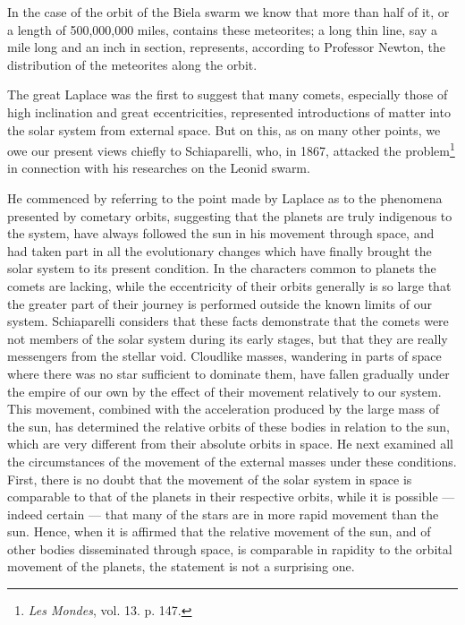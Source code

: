 \documentclass[a4paper, 12pt, oneside, polutonikogreek, english]{article}
\begin{document}
In the case of the orbit of the Biela swarm we know that more than half of it, or a length of 500,000,000 miles, contains these meteorites; a long thin line, say a mile long and an inch in section, represents, according to Professor Newton, the distribution of the meteorites along the orbit.

The great Laplace was the first to suggest that many comets, especially those of high inclination and great eccentricities, represented introductions of matter into the solar system from external space. But on this, as on many other points, we owe our present views chiefly to Schiaparelli, who, in 1867, attacked the problem\footnote{\emph{Les Mondes}, vol. 13. p. 147.} in connection with his researches on the Leonid swarm.

He commenced by referring to the point made by Laplace as to the phenomena presented by cometary orbits, suggesting that the planets are truly indigenous to the system, have always followed the sun in his movement through space, and had taken part in all the evolutionary changes which have finally brought the solar system to its present condition. In the characters common to planets the comets are lacking, while the eccentricity of their orbits generally is so large that the greater part of their journey is performed outside the known limits of our system. Schiaparelli considers that these facts demonstrate that the comets were not members of the solar system during its early stages, but that they are really messengers from the stellar void. Cloudlike masses, wandering in parts of space where there was no star sufficient to dominate them, have fallen gradually under the empire of our own by the effect of their movement relatively to our system. This movement, combined with the acceleration produced by the large mass of the sun, has determined the relative orbits of these bodies in relation to the sun, which are very different from their absolute orbits in space. He next examined all the circumstances of the movement of the external masses under these conditions. First, there is no doubt that the movement of the solar system in space is comparable to that of the planets in their respective orbits, while it is possible --- indeed certain --- that many of the stars are in more rapid movement than the sun. Hence, when it is affirmed that the relative movement of the sun, and of other bodies disseminated through space, is comparable in rapidity to the orbital movement of the planets, the statement is not a surprising one.
\end{document}
